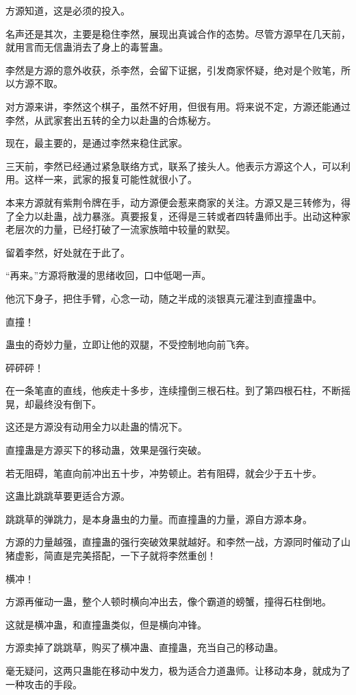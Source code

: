 \begin{this_body}
方源知道，这是必须的投入。

名声还是其次，主要是稳住李然，展现出真诚合作的态势。尽管方源早在几天前，就用言而无信蛊消去了身上的毒誓蛊。

李然是方源的意外收获，杀李然，会留下证据，引发商家怀疑，绝对是个败笔，所以方源不取。

对方源来讲，李然这个棋子，虽然不好用，但很有用。将来说不定，方源还能通过李然，从武家套出五转的全力以赴蛊的合炼秘方。

现在，最主要的，是通过李然来稳住武家。

三天前，李然已经通过紧急联络方式，联系了接头人。他表示方源这个人，可以利用。这样一来，武家的报复可能性就很小了。

本来方源就有紫荆令牌在手，动方源便会惹来商家的关注。方源又是三转修为，得了全力以赴蛊，战力暴涨。真要报复，还得是三转或者四转蛊师出手。出动这种家老层次的力量，已经打破了一流家族暗中较量的默契。

留着李然，好处就在于此了。

“再来。”方源将散漫的思绪收回，口中低喝一声。

他沉下身子，把住手臂，心念一动，随之半成的淡银真元灌注到直撞蛊中。

直撞！

蛊虫的奇妙力量，立即让他的双腿，不受控制地向前飞奔。

砰砰砰！

在一条笔直的直线，他疾走十多步，连续撞倒三根石柱。到了第四根石柱，不断摇晃，却最终没有倒下。

这还是方源没有动用全力以赴蛊的情况下。

直撞蛊是方源买下的移动蛊，效果是强行突破。

若无阻碍，笔直向前冲出五十步，冲势顿止。若有阻碍，就会少于五十步。

这蛊比跳跳草要更适合方源。

跳跳草的弹跳力，是本身蛊虫的力量。而直撞蛊的力量，源自方源本身。

方源的力量越强，直撞蛊的强行突破效果就越好。和李然一战，方源同时催动了山猪虚影，简直是完美搭配，一下子就将李然重创！

横冲！

方源再催动一蛊，整个人顿时横向冲出去，像个霸道的螃蟹，撞得石柱倒地。

这就是横冲蛊，和直撞蛊类似，但是横向冲锋。

方源卖掉了跳跳草，购买了横冲蛊、直撞蛊，充当自己的移动蛊。

毫无疑问，这两只蛊能在移动中发力，极为适合力道蛊师。让移动本身，就成为了一种攻击的手段。


\end{this_body}
